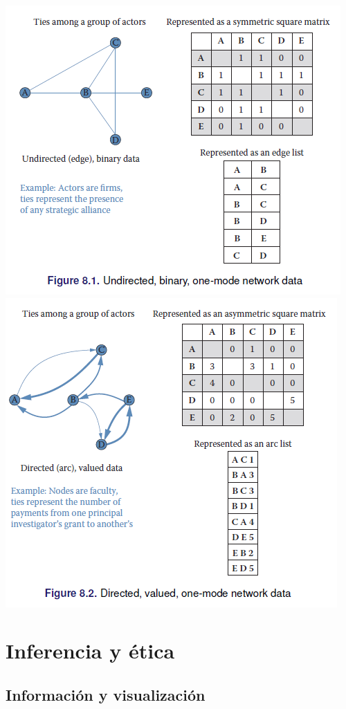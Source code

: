 \documentclass[
]{book}
\begin{document}
\includegraphics{images/bd7.PNG}
\includegraphics{images/bd8.PNG}

\hypertarget{inferencia-y-uxe9tica}{%
\section{Inferencia y ética}\label{inferencia-y-uxe9tica}}

\hypertarget{informaciuxf3n-y-visualizaciuxf3n}{%
\subsection{Información y visualización}\label{informaciuxf3n-y-visualizaciuxf3n}}
\end{document}
